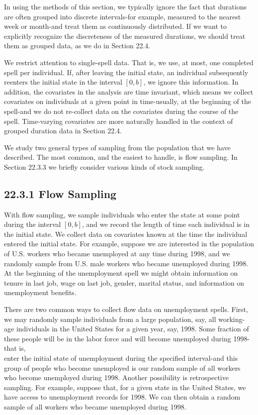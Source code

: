 \documentclass[10pt]{article}
\begin{document}
In using the methods of this section, we typically ignore the fact that durations are often grouped into discrete intervals-for example, measured to the nearest week or month-and treat them as continuously distributed. If we want to explicitly recognize the discreteness of the measured durations, we should treat them as grouped data, as we do in Section 22.4.

We restrict attention to single-spell data. That is, we use, at most, one completed spell per individual. If, after leaving the initial state, an individual subsequently reenters the initial state in the interval $[0, b]$, we ignore this information. In addition, the covariates in the analysis are time invariant, which means we collect covariates on individuals at a given point in time-usually, at the beginning of the spell-and we do not re-collect data on the covariates during the course of the spell. Time-varying covariates are more naturally handled in the context of grouped duration data in Section 22.4.

We study two general types of sampling from the population that we have described. The most common, and the easiest to handle, is flow sampling. In Section 22.3.3 we briefly consider various kinds of stock sampling.

\subsection*{22.3.1 Flow Sampling}
With flow sampling, we sample individuals who enter the state at some point during the interval $[0, b]$, and we record the length of time each individual is in the initial state. We collect data on covariates known at the time the individual entered the initial state. For example, suppose we are interested in the population of U.S. workers who became unemployed at any time during 1998, and we randomly sample from U.S. male workers who became unemployed during 1998. At the beginning of the unemployment spell we might obtain information on tenure in last job, wage on last job, gender, marital status, and information on unemployment benefits.

There are two common ways to collect flow data on unemployment spells. First, we may randomly sample individuals from a large population, say, all working-age individuals in the United States for a given year, say, 1998. Some fraction of these people will be in the labor force and will become unemployed during 1998-that is,\\
enter the initial state of unemployment during the specified interval-and this group of people who become unemployed is our random sample of all workers who become unemployed during 1998. Another possibility is retrospective sampling. For example, suppose that, for a given state in the United States, we have access to unemployment records for 1998. We can then obtain a random sample of all workers who became unemployed during 1998.
\end{document}
